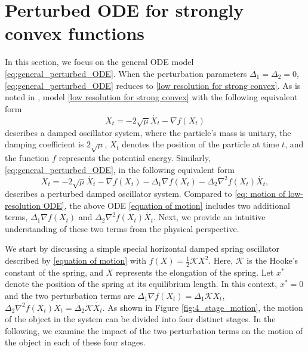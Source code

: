 \documentclass[11pt]{article}
\newcommand{\1}{\mathbf 1}
\numberwithin{equation}{section}
\begin{document}
\section{Perturbed ODE for strongly convex functions}
\label{sec: continuous case}
In this section, we focus on the general ODE model \eqref{eq:general_perturbed_ODE}. When the perturbation parameters $\Delta_1=\Delta_2=0$, \eqref{eq:general_perturbed_ODE} reduces to \eqref{low resolution for strong convex}. As is noted in \cite{Yang_2018_physical}, model \eqref{low resolution for strong convex} with the following equivalent form 
\begin{equation}
    \label{eq: motion of low-resolution ODE}
    \ddot{X_t}=-2\sqrt{\mu}\dot{X_t}-\nabla f(X_t)
\end{equation}
describes a damped oscillator system,
where the particle's mass is unitary, the damping coefficient is $2\sqrt{\mu}$, $X_t$ denotes the position of the particle at time $t$, and the function $f$ represents the potential energy. Similarly,  \eqref{eq:general_perturbed_ODE}, in the following equivalent form
\begin{equation}
    \label{equation of motion}
    \ddot{X_t}=-2\sqrt{\mu}\dot{X_t}-\nabla f(X_t)-\Delta_1\nabla f(X_t)-\Delta_2\nabla^2 f(X_t)\dot{X_t},
\end{equation}
describes a perturbed damped oscillator system.
Compared to \eqref{eq: motion of low-resolution ODE}, the above ODE \eqref{equation of motion} includes two additional terms, $\Delta_1\nabla f(X_t)$ and $\Delta_2\nabla^2 f(X_t)\dot{X_t}$. 
Next, we provide an intuitive understanding of these two terms from the physical perspective.



We start by discussing a simple special horizontal damped spring oscillator described by \eqref{equation of motion} with
 $f(X)=\frac{1}{2}\mathcal{K}X^2$. Here, $\mathcal{K}$ is the Hooke's constant of the spring, and $X$ represents the elongation of the spring.  Let $x^*$ denote the position of the spring at its equilibrium length.
In this context, $x^* = 0$ and the two perturbation terms are $\Delta_1\nabla f(X_t)=\Delta_1\mathcal{K}X_t$, $\Delta_2\nabla^2 f(X_t)\dot{X_t}=\Delta_2\mathcal{K}\dot{X_t}$. As shown in Figure \ref{fig:4_stage_motion}, the motion of the object in the system can be divided into four distinct stages.  In the following, we examine the impact of the two perturbation terms on the motion of the object in each of these four stages.
\end{document}
